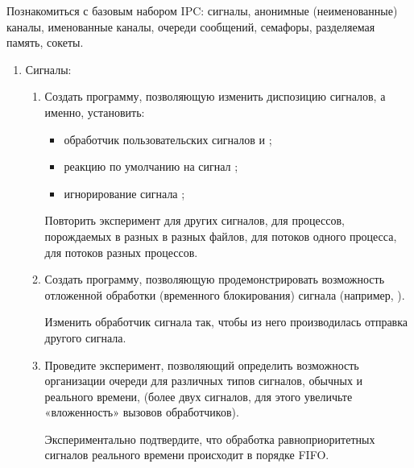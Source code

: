 \renewcommand{\labelenumii}{\theenumii}
\renewcommand{\theenumii}{\theenumi.\arabic{enumii}.}

Познакомиться с базовым набором IPC: сигналы, анонимные (неименованные) каналы, именованные каналы, очереди сообщений, семафоры, разделяемая память, сокеты.

\begin{enumerate}
	\item Сигналы:
		\begin{enumerate}
			\item Создать программу, позволяющую изменить диспозицию сигналов, а именно, установить:
				\begin{itemize}[itemsep=0.3em]
					\item обработчик пользовательских сигналов  и ;
					\item реакцию по умолчанию на сигнал ;
					\item игнорирование сигнала ;
				\end{itemize}
			Повторить эксперимент для других сигналов, для процессов, порождаемых в разных в разных файлов, для потоков одного процесса, для потоков разных процессов.
			\item Создать программу, позволяющую продемонстрировать возможность отложенной обработки (временного блокирования) сигнала (например, ).
			
			Изменить обработчик сигнала так, чтобы из него производилась отправка другого сигнала.
			\item Проведите эксперимент, позволяющий определить возможность организации очереди для различных типов сигналов, обычных и реального времени, (более двух сигналов, для этого увеличьте «вложенность» вызовов обработчиков).
			
			Экспериментально подтвердите, что обработка равноприоритетных сигналов реального времени происходит в порядке FIFO.
			

\end{enumerate}
\end{enumerate}
